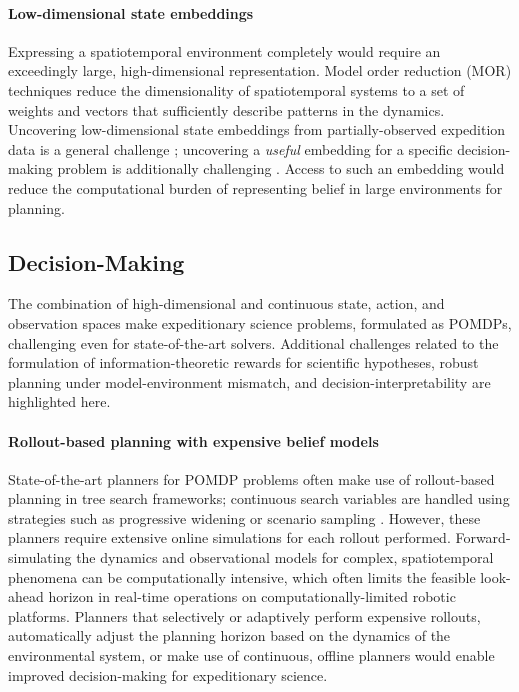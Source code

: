 \paragraph{Low-dimensional state embeddings}
Expressing a spatiotemporal environment completely would require an exceedingly large, high-dimensional representation. Model order reduction (MOR) techniques reduce the dimensionality of spatiotemporal systems to a set of weights and vectors that sufficiently describe patterns in the dynamics. Uncovering low-dimensional state embeddings from partially-observed expedition data is a general challenge \autocite{spantini2018inference}; uncovering a \emph{useful} embedding for a specific decision-making problem is additionally challenging \autocite{pacelli2019task}. Access to such an embedding would reduce the computational burden of representing belief in large environments for planning.


\subsection{Decision-Making}
The combination of high-dimensional and continuous state, action, and observation spaces make expeditionary science problems, formulated as POMDPs, challenging even for state-of-the-art solvers. Additional challenges related to the formulation of information-theoretic rewards for scientific hypotheses, robust planning under model-environment mismatch, and decision-interpretability are highlighted here.

\paragraph{Rollout-based planning with expensive belief models}
State-of-the-art planners for POMDP problems often make use of rollout-based planning in tree search frameworks; continuous search variables are handled using strategies such as progressive widening or scenario sampling \autocite{sunberg2018online}. However, these planners require extensive online simulations for each rollout performed. Forward-simulating the dynamics and observational models for complex, spatiotemporal phenomena can be computationally intensive, which often limits the feasible look-ahead horizon in real-time operations on computationally-limited robotic platforms.  Planners that selectively or adaptively perform expensive rollouts, automatically adjust the planning horizon based on the dynamics of the environmental system, or make use of continuous, offline planners would enable improved decision-making for expeditionary science.

